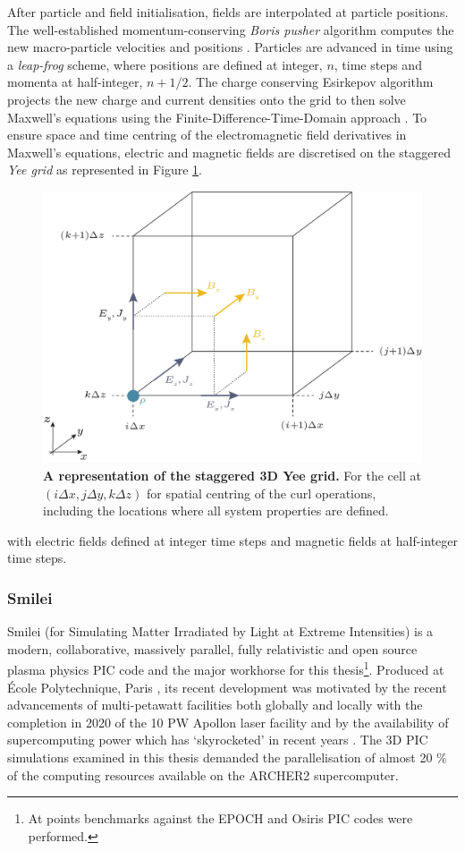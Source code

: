 After particle and field initialisation, fields are interpolated at particle positions. The well-established momentum-conserving \textit{Boris pusher} algorithm computes the new macro-particle velocities and positions \cite{borisRelativisticPlasmaSimulationoptimization1970}. Particles are advanced in time using a \textit{leap-frog }scheme, where positions are defined at integer, $n$, time steps and momenta at half-integer, $n + 1/2$. The charge conserving Esirkepov algorithm \cite{esirkepovExactChargeConservation2001} projects the new charge and current densities onto the grid to then solve Maxwell's equations using the Finite-Difference-Time-Domain approach \cite{tafloveComputationalElectromagneticsFiniteDifference2005}. To ensure space and time centring of the electromagnetic field derivatives in Maxwell's equations, electric and magnetic fields are discretised on the staggered \textit{Yee grid} as represented in Figure \ref{fig:introyeegrid}. 
\begin{figure}
	\centering
	\includegraphics[width=0.7\linewidth]{figures/intro/intro_yee_grid}
	\caption[A representation of the staggered Yee grid.]{\textbf{A representation of the staggered 3D Yee grid.} For the cell at $(i\Delta x, j\Delta y, k\Delta z)$ for spatial centring of the curl operations, including the locations where all system properties are defined.}
	\label{fig:introyeegrid}
\end{figure}
with electric fields defined at integer time steps and magnetic fields at half-integer time steps.

\subsubsection{Smilei}
Smilei (for Simulating Matter Irradiated by Light at Extreme Intensities) is a modern, collaborative, massively parallel, fully relativistic and open source plasma physics PIC code and the major workhorse for this thesis\footnote{At points benchmarks against the EPOCH and Osiris PIC codes were performed.}. 
Produced at École Polytechnique, Paris \cite{derouillatSmileiCollaborativeOpensource2018}, its recent development was motivated by the recent advancements of multi-petawatt facilities both globally and locally with the completion in 2020 of the 10 PW Apollon laser facility and by the availability of supercomputing power which has `skyrocketed' in recent years \cite{derouillatSmileiCollaborativeOpensource2018}. The 3D \ac{PIC} simulations examined in this thesis demanded the parallelisation of almost 20 \% of the computing resources available on the ARCHER2 supercomputer.

